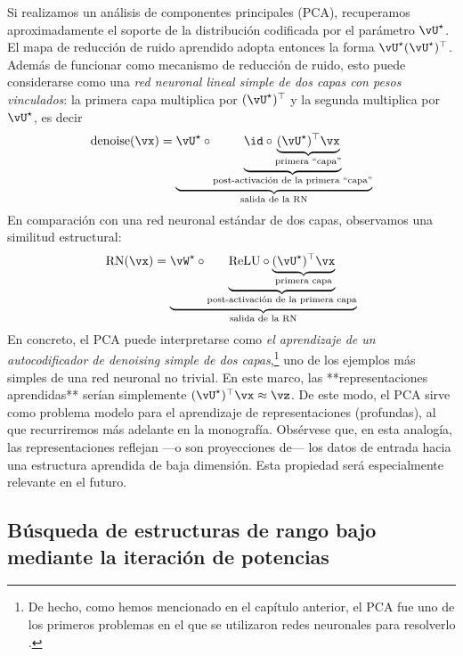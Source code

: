 \documentclass[../../book-main.tex]{subfiles}
\begin{document}
\begin{remark}
    Si realizamos un análisis de componentes principales (PCA), recuperamos aproximadamente el soporte de la distribución
    codificada por el parámetro \(\vU^{\star}\). El mapa de reducción de ruido aprendido adopta entonces
    la forma \(\vU^{\star}(\vU^{\star})^{\top}\). Además de funcionar como mecanismo de reducción de ruido, esto 
    puede considerarse como una \textit{red neuronal lineal simple de dos capas con pesos vinculados}: la 
    primera capa multiplica por \((\vU^{\star})^{\top}\) y la segunda multiplica por \(\vU^{\star}\), es decir
    \begin{equation}
        \operatorname{denoise}(\vx) = \underbrace{\vU^{\star} \circ
            \underbrace{\id \circ
                \underbrace{(\vU^{\star})^{\top}\vx}_{\text{primera
            ``capa''}}}_{\text{post-activación de la primera
        ``capa''}}}_{\text{salida de la RN}}
    \end{equation}
    En comparación con una red neuronal estándar de dos capas, observamos una 
    similitud estructural:
    \begin{equation}
        \operatorname{RN}(\vx) = \underbrace{\vW^{\star} \circ
            \underbrace{\mathrm{ReLU} \circ
                \underbrace{(\vU^{\star})^{\top}\vx}_{\text{primera
        capa}}}_{\text{post-activación de la primera capa}}}_{\text{salida de la RN}}
    \end{equation}
    En concreto, el PCA puede interpretarse como \textit{el aprendizaje de un autocodificador de \textit{denoising} simple de 
    dos capas},\footnote{De hecho, como hemos mencionado en el
        capítulo anterior, el PCA fue uno de los primeros problemas en el que se
    utilizaron redes neuronales para resolverlo \cite{Oja1982SimplifiedNM,Baldi89}.} 
    uno de los ejemplos más simples de una red neuronal no trivial. En este marco, 
    las **representaciones aprendidas** serían simplemente \((\vU^{\star})^{\top}\vx \approx \vz\). De este modo, el PCA sirve
    como problema modelo para el aprendizaje de representaciones (profundas), al que
    recurriremos más adelante en la monografía. Obsérvese que, en esta
    analogía, las representaciones reflejan ---o son proyecciones de--- los
    datos de entrada hacia una estructura aprendida de baja dimensión. Esta
    propiedad será especialmente relevante en el futuro.
\end{remark}

\subsection{Búsqueda de estructuras de rango bajo mediante la iteración de potencias}
\label{subsec:power iterations}
\end{document}
